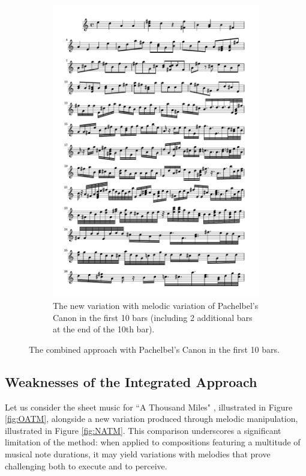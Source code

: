 \documentclass[11pt]{article}
\theoremstyle{definition}
\begin{document}
\begin{figure}
\begin{subfigure}{\textwidth}
\includegraphics[trim=1cm 20.3cm 1cm 0.5cm, clip, scale=0.8]{New_CND.pdf}
\caption{The new variation with melodic variation of Pachelbel's Canon in the first 10 bars (including 2 additional bars at the end of the 10th bar).} 
\label{fig:NCND}
\end{subfigure}
\caption{The combined approach with Pachelbel's Canon in the first 10 bars.} 
\label{fig: exam1}
\end{figure}

\subsection{Weaknesses of the Integrated Approach}

Let us consider the sheet music for ``A Thousand Miles" \cite{carlton2009thousandmiles}, illustrated in Figure \ref{fig:OATM}, alongside a new variation produced through melodic manipulation, illustrated in Figure \ref{fig:NATM}. 
This comparison underscores a significant limitation of the method: when applied to compositions featuring a multitude of musical note durations, it may yield variations with melodies that prove challenging both to execute and to perceive.
\end{document}
